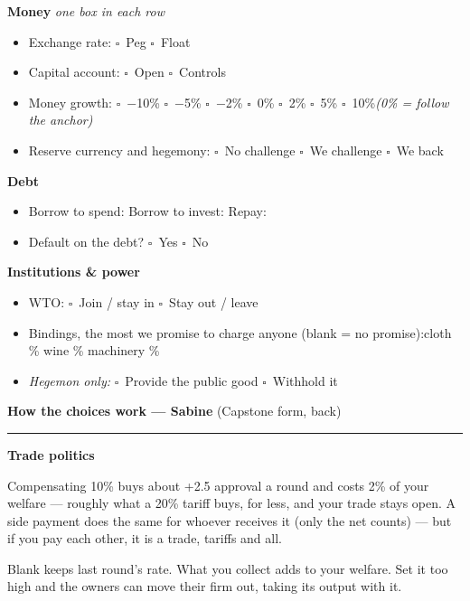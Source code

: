\documentclass[11pt]{article}
\newcommand{\blank}[1]{\underline{\hspace{#1}}}
\newcommand{\boxx}{$\square$}
\newcommand{\hr}{\par\vspace{2pt}\noindent\rule{\linewidth}{0.4pt}\par\vspace{2pt}}
\begin{document}
{\bfseries Money} \hfill \textit{one box in each row}\par
\begin{itemize}[nosep,leftmargin=1.4em]
  \item Exchange rate: \quad \boxx\ Peg \quad \boxx\ Float
  \item Capital account: \quad \boxx\ Open \quad \boxx\ Controls
  \item Money growth: \quad \boxx\ $-$10\% \quad \boxx\ $-$5\% \quad \boxx\ $-$2\% \quad \boxx\ 0\% \quad \boxx\ 2\% \quad \boxx\ 5\% \quad \boxx\ 10\%\newline \textit{(0\% = follow the anchor)}
  \item Reserve currency and hegemony: \quad \boxx\ No challenge \quad \boxx\ We challenge \quad \boxx\ We back \blank{2.2cm}
\end{itemize}

{\bfseries Debt}\par
\begin{itemize}[nosep,leftmargin=1.4em]
  \item Borrow to spend: \blank{2.2cm} \quad Borrow to invest: \blank{2.2cm} \quad Repay: \blank{2.2cm}
  \item Default on the debt? \quad \boxx\ Yes \quad \boxx\ No
\end{itemize}

{\bfseries Institutions \& power}\par
\begin{itemize}[nosep,leftmargin=1.4em]
  \item WTO: \quad \boxx\ Join / stay in \quad \boxx\ Stay out / leave
  \item Bindings, the most we promise to charge anyone (blank = no promise):\newline cloth \blank{1.3cm}\% \quad wine \blank{1.3cm}\% \quad machinery \blank{1.3cm}\%
  \item \textit{Hegemon only:} \quad \boxx\ Provide the public good \quad \boxx\ Withhold it
\end{itemize}

\newpage
{\large\bfseries How the choices work --- Sabine} \hfill (Capstone form, back)\par
\hr

{\bfseries Trade politics}\par
{\footnotesize
\begin{description}[nosep,style=sameline,leftmargin=5.6em,font=\normalfont\bfseries]
  \item[Compensate] Compensating 10\% buys about +2.5 approval a round and costs 2\% of your welfare --- roughly what a 20\% tariff buys, for less, and your trade stays open. A side payment does the same for whoever receives it (only the net counts) --- but if you pay each other, it is a trade, tariffs and all.
  \item[MNC tax] Blank keeps last round's rate. What you collect adds to your welfare. Set it too high and the owners can move their firm out, taking its output with it.
\end{description}}
\end{document}
